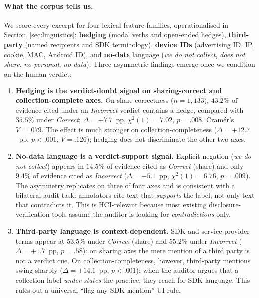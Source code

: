 \documentclass[11pt,a4paper]{article}
\begin{document}
\paragraph{What the corpus tells us.}
We score every excerpt for four lexical feature families,
operationalised in Section~\ref{sec:linguistics}: \textbf{hedging}
(modal verbs and open-ended hedges), \textbf{third-party} (named
recipients and SDK terminology), \textbf{device IDs} (advertising
ID, IP, cookie, MAC, Android ID), and \textbf{no-data} language
(\emph{we do not collect}, \emph{does not share}, \emph{no personal},
\emph{no data}). Three asymmetric findings emerge once we condition on
the human verdict:
\begin{enumerate}[label=\textbf{F\arabic*.},leftmargin=*,itemsep=2pt,topsep=2pt]
\item \textbf{Hedging is the verdict-doubt signal on sharing-correct
and collection-complete axes.} On share-correctness ($n=1{,}133$),
$43.2\%$ of evidence cited under an \emph{Incorrect} verdict contains
a hedge, compared with $35.5\%$ under \emph{Correct}; $\Delta=+7.7$~pp,
$\chi^{2}(1)=7.02$, $p=.008$, Cram\'{e}r's $V=.079$. The effect is
much stronger on collection-completeness ($\Delta=+12.7$~pp,
$p<.001$, $V=.126$); hedging does not discriminate the other two
axes.
\item \textbf{No-data language is a verdict-support signal.} Explicit
negation (\emph{we do not collect}) appears in $14.5\%$ of evidence
cited as \emph{Correct} (share) and only $9.4\%$ of evidence cited as
\emph{Incorrect} ($\Delta=-5.1$~pp, $\chi^{2}(1)=6.76$, $p=.009$). The
asymmetry replicates on three of four axes and is consistent with a
bilateral audit task: annotators cite text that \emph{supports} the
label, not only text that contradicts it. This is HCI-relevant
because most existing disclosure-verification tools assume the
auditor is looking for \emph{contradictions} only.
\item \textbf{Third-party language is context-dependent.} SDK and
service-provider terms appear at $53.5\%$ under \emph{Correct} (share)
and $55.2\%$ under \emph{Incorrect} ($\Delta=+1.7$~pp, $p=.58$): on
sharing axes the mere mention of a third party is not a verdict cue.
On collection-completeness, however, third-party mentions swing
sharply ($\Delta=+14.1$~pp, $p<.001$): when the auditor argues that a
collection label \emph{under-states} the practice, they reach for SDK
language. This rules out a universal ``flag any SDK mention'' UI rule.
\end{enumerate}
\end{document}
